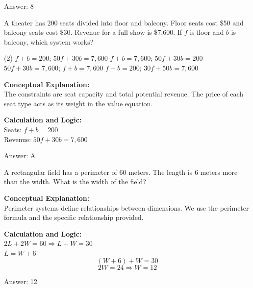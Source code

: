 \documentclass[11pt,paper=a4,answers]{exam}
\begin{document}
\begin{questions}
\begin{solution}
\vspace{15pt}
Answer: \colorbox{yellow!100}{8}
\end{solution}

\question
A theater has 200 seats divided into floor and balcony. Floor seats cost \$50 and balcony seats cost \$30. Revenue for a full show is \$7,600. If $f$ is floor and $b$ is balcony, which system works?
\begin{tasks}(2)
    \task $f + b = 200$; $50f + 30b = 7,600$
    \task $f + b = 7,600$; $50f + 30b = 200$
    \task $50f + 30b = 7,600$; $f + b = 7,600$
    \task $f + b = 200$; $30f + 50b = 7,600$
\end{tasks}

\begin{solution}
\textbf{Conceptual Explanation:} \\
The constraints are seat capacity and total potential revenue. The price of each seat type acts as its weight in the value equation.

\vspace{10pt}
\textbf{Calculation and Logic:} \\
Seats: $f + b = 200$ \\
Revenue: $50f + 30b = 7,600$

\vspace{15pt}
Answer: \colorbox{yellow!100}{A}
\end{solution}

\question
A rectangular field has a perimeter of 60 meters. The length is 6 meters more than the width. What is the width of the field?

\begin{solution}
\textbf{Conceptual Explanation:} \\
Perimeter systems define relationships between dimensions. We use the perimeter formula and the specific relationship provided.

\vspace{10pt}
\textbf{Calculation and Logic:} \\
$2L + 2W = 60 \Rightarrow L + W = 30$ \\
$L = W + 6$ \\
\[(W + 6) + W = 30\]
\[2W = 24 \Rightarrow W = 12\]

\vspace{15pt}
Answer: \colorbox{yellow!100}{12}
\end{solution}


\end{questions}
\end{document}
